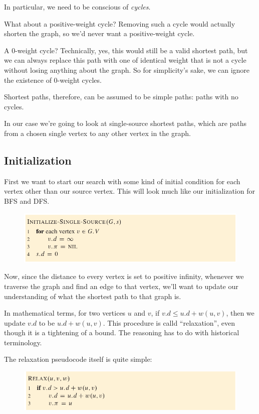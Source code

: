 \documentclass[]{article}
\begin{document}
In particular, we need to be conscious of \textit{cycles}. 

What about a positive-weight cycle? Removing such a cycle would actually shorten the graph, so we'd never want a positive-weight cycle. 

A 0-weight cycle? Technically, yes, this would still be a valid shortest path, but we can always replace this path with one of identical weight that is not a cycle without losing anything about the graph. So for simplicity's sake, we can ignore the existence of 0-weight cycles.

Shortest paths, therefore, can be assumed to be simple paths: paths with no cycles. 

In our case we're going to look at single-source shortest paths, which are paths from a chosen single vertex to any other vertex in the graph. 

\subsection*{Initialization}

First we want to start our search with some kind of initial condition for each vertex other than our source vertex. This will look much like our initialization for BFS and DFS.  

\begin{figure}[h]
    \includegraphics[width=\textwidth]{ssp-initialize-pseudo.png}
\end{figure}

Now, since the distance to every vertex is set to positive infinity, whenever we traverse the graph and find an edge to that vertex, we'll want to update our understanding of what the shortest path to that graph is. 

In mathematical terms, for two vertices $u$ and $v$, if $v.d \leq u.d + w(u,v)$, then we update $v.d$ to be $u.d + w(u,v)$. This procedure is calld ``relaxation'', even though it is a tightening of a bound. The reasoning has to do with historical terminology. 

The relaxation pseudocode itself is quite simple:

\begin{figure}[h]
    \includegraphics[width=\textwidth]{ssp-relax-pseudo.png}
\end{figure}
\end{document}
